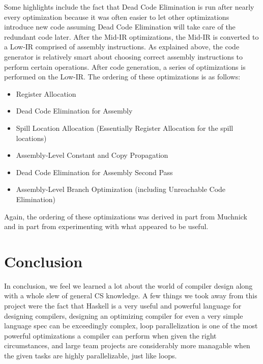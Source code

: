 \documentclass[11pt]{article}
\begin{document}
Some highlights include the fact that Dead Code Elimination is run
after nearly every optimization because it was often easier to let
other optimizations introduce new code assuming Dead Code Elimination
will take care of the redundant code later. After the Mid-IR
optimizations, the Mid-IR is converted to a Low-IR comprised of
assembly instructions. As explained above, the code generator is
relatively smart about choosing correct assembly
instructions to perform certain operations. After code generation, a
series of optimizations is performed on the Low-IR. The ordering of
these optimizations is as follows: 

\begin{itemize}

\item Register Allocation 

\item Dead Code Elimination for Assembly 

\item Spill Location Allocation (Essentially Register Allocation for
  the spill locations)

\item Assembly-Level Constant and Copy Propagation 

\item Dead Code Elimination for Assembly Second Pass

\item Assembly-Level Branch Optimization (including Unreachable Code Elimination)

\end{itemize}

Again, the ordering of these optimizations was derived in part from
Muchnick and in part from experimenting with what appeared to be
useful. 

\section{Conclusion}

In conclusion, we feel we learned a lot about the world of compiler
design along with a whole slew of general CS knowledge. A few things
we took away from this project were the fact that Haskell is a very
useful and powerful language for designing compilers, designing an
optimizing compiler for even a very simple language spec can be
exceedingly complex, loop parallelization is one of the most powerful
optimizations a compiler can perform when given the right
circumstances, and large team projects are considerably more managable
when the given tasks are highly parallelizable, just like loops. 
\end{document}
